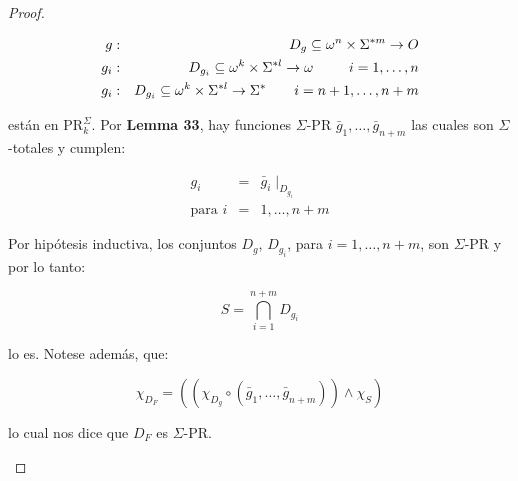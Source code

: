 \begin{proof}
\begin{enumerate}
        \begin{eqnarray}
          \nonumber g &:& D_{g} \subseteq \omega^{n} \times \Sigma^{\ast m} \rightarrow O \\
          \nonumber g_{i} &:& D_{g_{i}} \subseteq \omega^{k} \times \Sigma^{\ast l} \rightarrow \omega \qquad \;\; i = 1,
          \dotsc, n \\
          \nonumber g_{i} &:& D_{g_{i}} \subseteq \omega^{k} \times \Sigma^{\ast l} \rightarrow \Sigma^{\ast} \qquad i = n + 1,
          \dotsc, n + m
        \end{eqnarray}

        \par están en $\mathrm{PR}_{k}^{\Sigma}$. Por \textbf{Lemma 33}, hay funciones $\Sigma$-PR $\bar{g}_{1}, \dotsc,
        \bar{g}_{n+m}$ las cuales son $\Sigma$-totales y cumplen:

        \begin{eqnarray}
          \nonumber g_{i} &=& \bar{g}_{i} \mid_{D_{g_{i}}} \\
          \nonumber \text{para } i &=& 1, \dotsc, n + m
        \end{eqnarray}

        \par Por hipótesis inductiva, los conjuntos $D_{g}$, $D_{g_{i}}$, para $i = 1, \dotsc, n + m$, son $\Sigma$-PR y
        por lo tanto:

        \[
          S = \bigcap_{i=1}^{n+m} D_{g_{i}}
        \]

        \par lo es. Notese además, que:

        \[
          \chi_{D_{F}} = \left((\chi_{D_{g}} \circ (\bar{g}_{1}, \dotsc, \bar{g}_{n+m})) \wedge \chi_{S}\right)
        \]

        \par lo cual nos dice que $D_{F}$ es $\Sigma$-PR.
    \end{enumerate}
  \end{proof}
